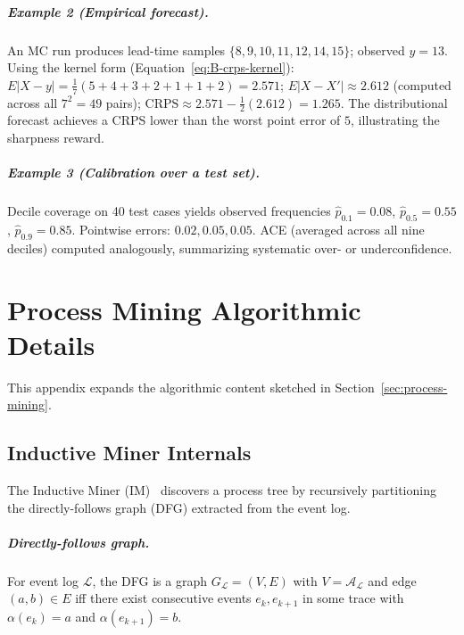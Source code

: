 \paragraph{Example 2 (Empirical forecast).} An MC run produces lead-time
samples $\{8, 9, 10, 11, 12, 14, 15\}$; observed $y = 13$. Using the
kernel form (Equation~\ref{eq:B-crps-kernel}):
$E |X - y| = \frac{1}{7}(5+4+3+2+1+1+2) = 2.571$;
$E |X - X'| \approx 2.612$ (computed across all $7^2 = 49$ pairs);
$\mathrm{CRPS} \approx 2.571 - \tfrac{1}{2}(2.612) = 1.265$. The
distributional forecast achieves a CRPS lower than the worst point error
of $5$, illustrating the sharpness reward.

\paragraph{Example 3 (Calibration over a test set).} Decile coverage on
40 test cases yields observed frequencies $\hat{p}_{0.1} = 0.08$,
$\hat{p}_{0.5} = 0.55$, $\hat{p}_{0.9} = 0.85$. Pointwise errors:
$0.02, 0.05, 0.05$. ACE (averaged across all nine deciles) computed
analogously, summarizing systematic over- or underconfidence.


\chapter{Process Mining Algorithmic Details}
\label{app:C}

This appendix expands the algorithmic content sketched in
Section~\ref{sec:process-mining}.


\section{Inductive Miner Internals}
\label{app:C-im}

The Inductive Miner (IM)~\cite{leemans2013discovering} discovers a process
tree by recursively partitioning the directly-follows graph (DFG) extracted
from the event log.

\paragraph{Directly-follows graph.} For event log $\mathcal{L}$, the DFG is
a graph $G_{\mathcal{L}} = (V, E)$ with $V = \mathcal{A}_{\mathcal{L}}$
and edge $(a, b) \in E$ iff there exist consecutive events $e_k, e_{k+1}$
in some trace with $\alpha(e_k) = a$ and $\alpha(e_{k+1}) = b$.

